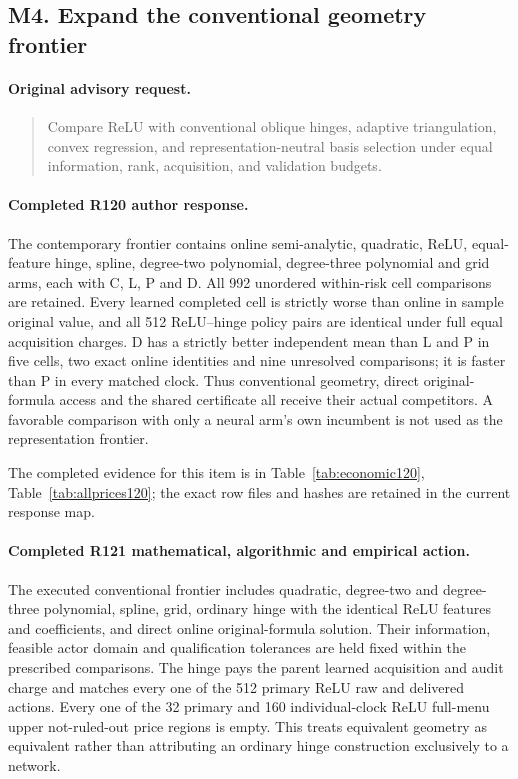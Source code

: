 \subsection{M4. Expand the conventional geometry frontier}
\label{response122:M4}

\paragraph{Original advisory request.}
\begin{quote}
Compare ReLU with conventional oblique hinges, adaptive triangulation, convex regression, and representation-neutral basis selection under equal information, rank, acquisition, and validation budgets.
\end{quote}

\paragraph{Completed R120 author response.}
The contemporary frontier contains online semi-analytic, quadratic, ReLU, equal-feature hinge, spline, degree-two polynomial, degree-three polynomial and grid arms, each with C, L, P and D. All 992 unordered within-risk cell comparisons are retained. Every learned completed cell is strictly worse than online in sample original value, and all 512 ReLU--hinge policy pairs are identical under full equal acquisition charges. D has a strictly better independent mean than L and P in five cells, two exact online identities and nine unresolved comparisons; it is faster than P in every matched clock. Thus conventional geometry, direct original-formula access and the shared certificate all receive their actual competitors. A favorable comparison with only a neural arm's own incumbent is not used as the representation frontier.

The completed evidence for this item is in Table~\ref{tab:economic120}, Table~\ref{tab:allprices120}; the exact row files and hashes are retained in the current response map.

\paragraph{Completed R121 mathematical, algorithmic and empirical action.}
The executed conventional frontier includes quadratic, degree-two and degree-three polynomial, spline, grid, ordinary hinge with the identical ReLU features and coefficients, and direct online original-formula solution. Their information, feasible actor domain and qualification tolerances are held fixed within the prescribed comparisons. The hinge pays the parent learned acquisition and audit charge and matches every one of the 512 primary ReLU raw and delivered actions. Every one of the 32 primary and 160 individual-clock ReLU full-menu upper not-ruled-out price regions is empty. This treats equivalent geometry as equivalent rather than attributing an ordinary hinge construction exclusively to a network.

